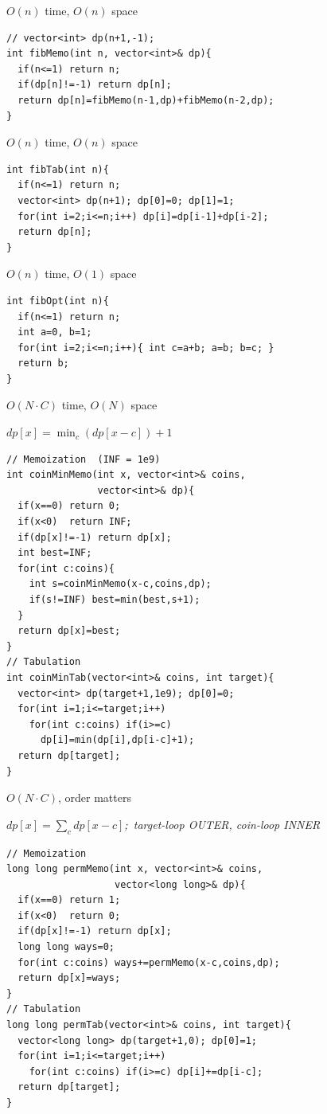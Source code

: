 \documentclass[8pt,landscape,a4paper]{extarticle}
\newcommand{\algo}[2]{\vspace{1pt}{\bfseries #1}\hfill{\footnotesize\color{cx}#2}\par\vspace{-1pt}}
\newcommand{\note}[1]{{\footnotesize\itshape #1}\par}
\begin{document}
\begin{multicols}{3}
\algo{Fibonacci --- Memoization}{$O(n)$ time, $O(n)$ space}
\begin{lstlisting}
// vector<int> dp(n+1,-1);
int fibMemo(int n, vector<int>& dp){
  if(n<=1) return n;
  if(dp[n]!=-1) return dp[n];
  return dp[n]=fibMemo(n-1,dp)+fibMemo(n-2,dp);
}
\end{lstlisting}
\algo{Fibonacci --- Tabulation}{$O(n)$ time, $O(n)$ space}
\begin{lstlisting}
int fibTab(int n){
  if(n<=1) return n;
  vector<int> dp(n+1); dp[0]=0; dp[1]=1;
  for(int i=2;i<=n;i++) dp[i]=dp[i-1]+dp[i-2];
  return dp[n];
}
\end{lstlisting}
\algo{Fibonacci --- Space Optimized}{$O(n)$ time, $O(1)$ space}
\begin{lstlisting}
int fibOpt(int n){
  if(n<=1) return n;
  int a=0, b=1;
  for(int i=2;i<=n;i++){ int c=a+b; a=b; b=c; }
  return b;
}
\end{lstlisting}

\algo{Coin Change 1 --- Min Coins}{$O(N\cdot C)$ time, $O(N)$ space}
\note{$dp[x]=\min_{c}(dp[x-c])+1$}
\begin{lstlisting}
// Memoization  (INF = 1e9)
int coinMinMemo(int x, vector<int>& coins,
                vector<int>& dp){
  if(x==0) return 0;
  if(x<0)  return INF;
  if(dp[x]!=-1) return dp[x];
  int best=INF;
  for(int c:coins){
    int s=coinMinMemo(x-c,coins,dp);
    if(s!=INF) best=min(best,s+1);
  }
  return dp[x]=best;
}
// Tabulation
int coinMinTab(vector<int>& coins, int target){
  vector<int> dp(target+1,1e9); dp[0]=0;
  for(int i=1;i<=target;i++)
    for(int c:coins) if(i>=c)
      dp[i]=min(dp[i],dp[i-c]+1);
  return dp[target];
}
\end{lstlisting}

\algo{Coin Change 2 --- Ways (Permutations)}{$O(N\cdot C)$, order matters}
\note{$dp[x]=\sum_{c} dp[x-c]$;\ target-loop OUTER, coin-loop INNER}
\begin{lstlisting}
// Memoization
long long permMemo(int x, vector<int>& coins,
                   vector<long long>& dp){
  if(x==0) return 1;
  if(x<0)  return 0;
  if(dp[x]!=-1) return dp[x];
  long long ways=0;
  for(int c:coins) ways+=permMemo(x-c,coins,dp);
  return dp[x]=ways;
}
// Tabulation
long long permTab(vector<int>& coins, int target){
  vector<long long> dp(target+1,0); dp[0]=1;
  for(int i=1;i<=target;i++)
    for(int c:coins) if(i>=c) dp[i]+=dp[i-c];
  return dp[target];
}
\end{lstlisting}


\end{multicols}
\end{document}
